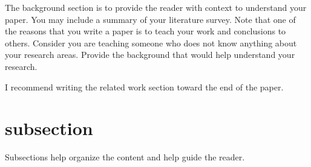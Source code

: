 The background section is to provide the reader with context to understand your paper. You may include a summary of your literature survey. Note that one of the reasons that you write a paper is to teach your work and conclusions to others.  Consider you are teaching someone who does not know anything about your research areas. Provide the background that would help understand your research. 

I recommend writing the related work section toward the end of the paper. 

\section{subsection}
Subsections help organize the content and help guide the reader. 
